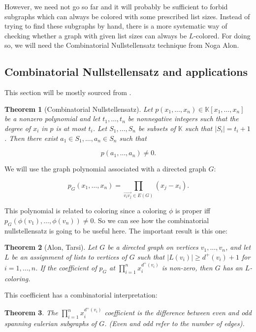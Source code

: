 \documentclass{article}
\newtheorem{theorem}{Theorem}
\begin{document}
However, we need not go so far and it will probably be sufficient to forbid subgraphs which can always be colored with some prescribed list sizes. Instead of trying to find these subgraphs by hand, there is a more systematic way of checking whether a graph with given list sizes can always be $L$-colored. For doing so, we will need the Combinatorial Nullstellensatz technique from Noga Alon. 


\subsection{Combinatorial Nullstellensatz and applications}

This section will be mostly sourced from \cite{dvoraknullstellensatz}.

\begin{theorem}[Combinatorial Nullstellensatz]
Let $p(x_1, \ldots, x_n) \in \mathbb{K}[x_1, \ldots, x_n]$ be a nonzero polynomial and let $t_1, \ldots, t_n$ be nonnegative integers such that the degree of $x_i$ in $p$ is at most $t_i$. Let $S_1, \ldots, S_n$ be subsets of $\mathbb{K}$ such that $|S_i| = t_i+1$. Then there exist $a_1 \in S_1, \ldots, a_n \in S_n$ such that

$$
p(a_1, \ldots, a_n) \neq 0.
$$
\end{theorem}

We will use the graph polynomial associated with a directed graph $G$:

$$
p_G(x_1, \ldots, x_n) = \prod_{\overrightarrow{v_iv_j}\in E(G)} (x_j-x_i).
$$

This polynomial is related to coloring since a coloring $\phi$ is proper iff $p_G(\phi(v_1), \ldots, \phi(v_n)) \neq 0$. So we can see how the combinatorial nullstellensatz is going to be useful here. The important result is this one:

\begin{theorem}[Alon, Tarsi]
Let $G$ be a directed graph on vertices $v_1, \ldots, v_n$, and let $L$ be an assignment of lists to vertices of $G$ such that $|L(v_i)| \geq d^+(v_i)+1$ for $i = 1, \ldots, n$. If the coefficient of $p_G$ at $\prod_{i=1}^n x_i^{d^+(v_i)}$ is non-zero, then $G$ has an $L$-coloring.
\end{theorem}

This coefficient has a combinatorial interpretation:

\begin{theorem}
The $\prod_{i=1}^n x_i^{d^+(v_i)}$ coefficient is the difference between even and odd spanning eulerian subgraphs of $G$. (\emph{Even} and \emph{odd} refer to the number of edges).
\end{theorem}
\end{document}
